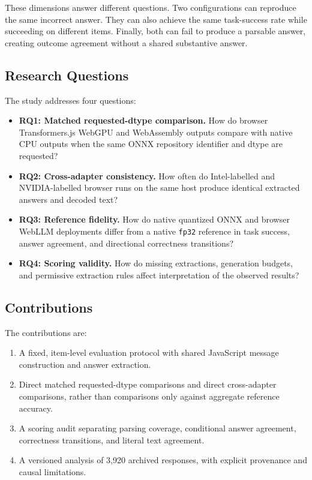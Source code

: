 \documentclass[conference]{IEEEtran}
\newcommand{\fp}{\texttt{fp32}}
\begin{document}
These dimensions answer different questions. Two
configurations can reproduce the same incorrect answer.
They can also achieve the same task-success rate while
succeeding on different items. Finally, both can fail to
produce a parsable answer, creating outcome agreement
without a shared substantive answer.


\subsection{Research Questions}

The study addresses four questions:

\begin{itemize}
\item \textbf{RQ1: Matched requested-dtype comparison.}
How do browser Transformers.js WebGPU and WebAssembly
outputs compare with native CPU outputs when the same ONNX
repository identifier and dtype are requested?

\item \textbf{RQ2: Cross-adapter consistency.}
How often do Intel-labelled and NVIDIA-labelled browser runs
on the same host produce identical extracted answers and
decoded text?

\item \textbf{RQ3: Reference fidelity.}
How do native quantized ONNX and browser WebLLM deployments
differ from a native \fp{} reference in task success, answer
agreement, and directional correctness transitions?

\item \textbf{RQ4: Scoring validity.}
How do missing extractions, generation budgets, and
permissive extraction rules affect interpretation of the
observed results?
\end{itemize}


\subsection{Contributions}

The contributions are:

\begin{enumerate}
\item A fixed, item-level evaluation protocol with shared
JavaScript message construction and answer extraction.

\item Direct matched requested-dtype comparisons and direct
cross-adapter comparisons, rather than comparisons only
against aggregate reference accuracy.

\item A scoring audit separating parsing coverage,
conditional answer agreement, correctness transitions,
and literal text agreement.

\item A versioned analysis of 3,920 archived responses,
with explicit provenance and causal limitations.
\end{enumerate}
\end{document}
